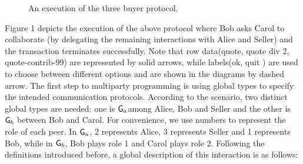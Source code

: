 \documentclass[a4paper]{article}
\begin{document}
\begin{figure}
\begin{center}
\end{center}
\caption{An execution of the three buyer protocol.}
\end{figure}

Figure 1 depicts the execution of the above protocol where Bob asks Carol to collaborate (by delegating the remaining interactions with Alice and Seller) and the transaction terminates successfully. Note that row data(quote, quote div 2, quote-contrib-99) are represented by solid arrows, while labels(ok, quit ) are used to choose between different options and are shown in the diagrams by dashed arrow.
The first step to multiparty programming is using global types to specify the intended communication protocols. According to the scenario, two distinct global types are needed: one is $\mathsf{G}_a$among Alice, Bob and Seller and the other is $\mathsf{G}_b$ between Bob and Carol. For convenience, we use numbers to represent the role of each peer. In $\mathsf{G}_a$, 2 represents Alice, 3 represents Seller and 1 represents Bob, while in $\mathsf{G}_b$, Bob plays role 1 and Carol plays role 2. Following the definitions introduced before, a global description of this interaction is as follows:
\\[2mm]
\end{document}
